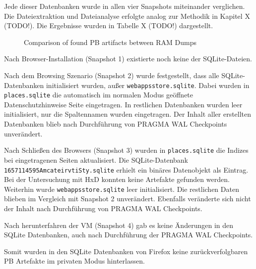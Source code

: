 \begin{appendices}
Jede dieser Datenbanken wurde in allen vier Snapshots miteinander verglichen. Die Dateiextraktion und Dateianalyse erfolgte analog zur Methodik in Kapitel X (TODO!).
Die Ergebnisse wurden in Tabelle X (TODO!) dargestellt.

\begin{figure}[h!]
	\centerline{}
	\label{chart:final-criteria}  
	\caption{Comparison of found PB artifacts between RAM Dumps}
\end{figure}
Nach Browser-Installation (Snapshot 1) existierte noch keine der SQLite-Dateien.

Nach dem Browsing Szenario (Snapshot 2) wurde festgestellt, dass alle SQLite-Datenbanken 
initialisiert wurden, außer \texttt{webappsstore.sqlite}. Dabei wurden in \texttt{places.sqlite} die automatisch im normalen Modus geöffnete Datenschutzhinweise Seite eingetragen. 
In restlichen Datenbanken wurden leer initialisiert, nur die Spaltennamen wurden eingetragen.
Der Inhalt aller erstellten Datenbanken blieb nach Durchführung von PRAGMA WAL Checkpoints unverändert.

Nach Schließen des Browsers (Snapshot 3) wurden in \texttt{places.sqlite} die Indizes bei eingetragenen Seiten aktualisiert. Die SQLite-Datenbank \texttt{1657114595AmcateirvtiSty.sqlite} erhielt ein binäres Datenobjekt als Eintrag. Bei der Untersuchung mit HxD konnten keine Artefakte gefunden werden. Weiterhin wurde \texttt{webappsstore.sqlite} leer initialisiert. Die restlichen Daten blieben im Vergleich mit Snapshot 2 unverändert. Ebenfalls veränderte sich nicht der Inhalt nach Durchführung von PRAGMA WAL Checkpoints.

Nach herunterfahren der VM (Snapshot 4) gab es keine Änderungen in den SQLite Datenbanken, auch nach Durchführung der PRAGMA WAL Checkpoints.
	
Somit wurden in den SQLite Datenbanken von Firefox keine zurückverfolgbaren PB Artefakte im privaten Modus hinterlassen.



\end{appendices}
